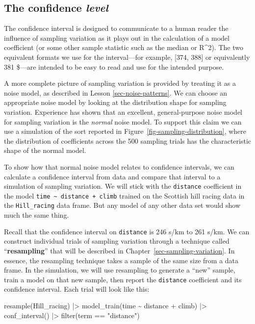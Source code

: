 \documentclass[
  letterpaper,
  DIV=11,
  numbers=noendperiod,
  oneside]{scrartcl}
\newenvironment{Shaded}{\begin{snugshade}}{\end{snugshade}}
\newcommand{\FunctionTok}[1]{\textcolor[rgb]{0.28,0.35,0.67}{#1}}
\newcommand{\NormalTok}[1]{\textcolor[rgb]{0.00,0.23,0.31}{#1}}
\newcommand{\SpecialCharTok}[1]{\textcolor[rgb]{0.37,0.37,0.37}{#1}}
\newcommand{\StringTok}[1]{\textcolor[rgb]{0.13,0.47,0.30}{#1}}
\begin{document}
\subsection{\texorpdfstring{The confidence
\emph{level}}{The confidence level}}\label{the-confidence-level}

The confidence interval is designed to communicate to a human reader the
influence of sampling variation as it plays out in the calculation of a
model coefficient (or some other sample statistic such as the median or
R\^{}2). The two equivalent formats we use for the interval---for
example, {[}374, 388{]} or equivalently 381 \$---are intended to be
easy to read and use for the intended purpose.

A more complete picture of sampling variation is provided by treating it
as a noise model, as described in Lesson \ref{sec-noise-patterns}. We
can choose an appropriate noise model by looking at the distribution
shape for sampling variation. Experience has shown that an excellent,
general-purpose noise model for sampling variation is the \emph{normal}
noise model. To support this claim we can use a simulation of the sort
reported in Figure~\ref{fig-sampling-distribution}, where the
distribution of coefficients across the 500 sampling trials has the
characteristic shape of the normal model.

To show how that normal noise model relates to confidence intervals, we
can calculate a confidence interval from data and compare that interval
to a simulation of sampling variation. We will stick with the
\texttt{distance} coefficient in the model
\texttt{time\ \textasciitilde{}\ distance\ +\ climb} trained on the
Scottish hill racing data in the \texttt{Hill\_racing} data frame. But
any model of any other data set would show much the same thing.

Recall that the confidence interval on \texttt{distance} is 246 s/km to
261 s/km. We can construct individual trials of sampling variation
through a technique called ``\textbf{resampling}'' that will be
described in Chapter~\ref{sec-sampling-variation}. In essence, the
resampling technique takes a sample of the same size from a data frame.
In the simulation, we will use resampling to generate a ``new'' sample,
train a model on that new sample, then report the \texttt{distance}
coefficient and its confidence interval. Each trial will look like this:

\begin{Shaded}
\begin{Highlighting}[]
\FunctionTok{resample}\NormalTok{(Hill\_racing) }\SpecialCharTok{|\textgreater{}}
  \FunctionTok{model\_train}\NormalTok{(time }\SpecialCharTok{\textasciitilde{}}\NormalTok{ distance }\SpecialCharTok{+}\NormalTok{ climb) }\SpecialCharTok{|\textgreater{}}
  \FunctionTok{conf\_interval}\NormalTok{() }\SpecialCharTok{|\textgreater{}}
  \FunctionTok{filter}\NormalTok{(term }\SpecialCharTok{==} \StringTok{"distance"}\NormalTok{)}
\end{Highlighting}
\end{Shaded}
\end{document}
